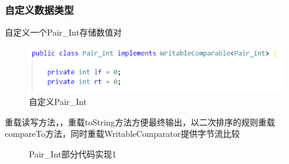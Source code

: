 \documentclass[a4paper,UTF8]{article}
\numberwithin{equation}{section}
\begin{document}
\subsubsection{自定义数据类型}
自定义一个Pair\_Int存储数值对
\begin{figure}[H]
    \centering

    \includegraphics[width = 15cm]{pairint1.png}

    \caption{自定义Pair\_Int}
\end{figure}
重载读写方法，，重载toString方法方便最终输出，以二次排序的规则重载compareTo方法，同时重载WritableComparator提供字节流比较
\begin{figure}[H]
    \centering
    \vfill
    \vfill
    \caption{Pair\_Int部分代码实现1}
    \label{PairInt}
\end{figure}
\end{document}
